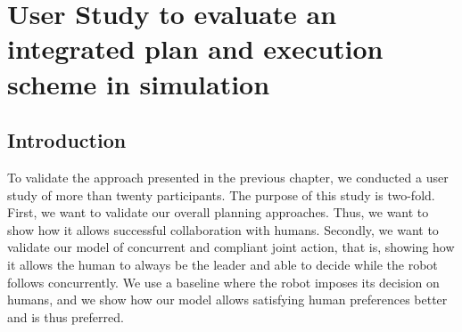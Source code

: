 \newpage
\thispagestyle{empty}
\mbox{}

\ifdefined{}
\else
\setcounter{chapter}{5} 
\dominitoc
\faketableofcontents
\fi

\chapter{User Study to evaluate an integrated plan and execution scheme in simulation}
\label{chap:6}
\minitoc


\section{Introduction}

To validate the approach presented in the previous chapter, we conducted a user study of more than twenty participants. The purpose of this study is two-fold. 
First, we want to validate our overall planning approaches. Thus, we want to show how it allows successful collaboration with humans. 
Secondly, we want to validate our model of concurrent and compliant joint action, that is, showing how it allows the human to always be the leader and able to decide while the robot follows concurrently. We use a baseline where the robot imposes its decision on humans, and we show how our model allows satisfying human preferences better and is thus preferred. 

